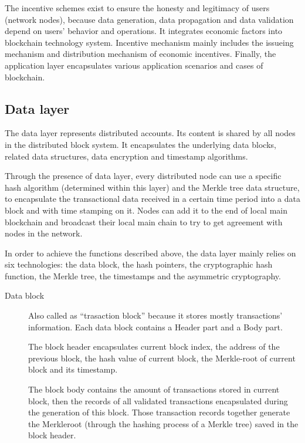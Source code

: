 \documentclass[doublespacing]{bmcart}
\begin{document}
\begin{CJK*}{UTF8}{gbsn}
The incentive schemes exist to ensure the honesty and legitimacy of users (network nodes), because data generation, data propagation and data validation depend on users' behavior and operations. It integrates economic factors into blockchain technology system. Incentive mechanism mainly includes the issueing mechanism and distribution mechanism of economic incentives.
 Finally, the application layer encapsulates various application scenarios and cases of blockchain.


\subsection{\textbf{Data layer}}
 The data layer represents distributed accounts. Its content is shared by all nodes in the distributed block system. It encapsulates the underlying data blocks, related data structures, data encryption and timestamp algorithms.
 
Through the presence of data layer, every distributed node can use a specific hash algorithm (determined within this layer) and the Merkle tree data structure, to encapsulate the transactional data received in a certain time period into a data block and with time stamping on it. Nodes can add it to the end of local main blockchain and broadcast their local main chain to try to get agreement with nodes in the network.
 
In order to achieve the functions described above, the data layer mainly relies on six technologies: the data block, the hash pointers, the cryptographic hash function, the Merkle tree, the timestamps and the asymmetric cryptography.
% 
\begin{description}
\item[Data block] 
% 
Also called as ``trasaction block'' because it stores mostly transactions' information. Each data block contains a Header part and a Body part.

The block header encapsulates current block index, the address of the previous block, the hash value of current block, the Merkle-root of current block and its timestamp.

The block body contains the amount of transactions stored in current block, then the records of all validated transactions encapsulated during the generation of this block. Those transaction records together generate the Merkleroot (through the hashing process of a Merkle tree) saved in the block header. 
 

\end{description}
\end{CJK*}
\end{document}
